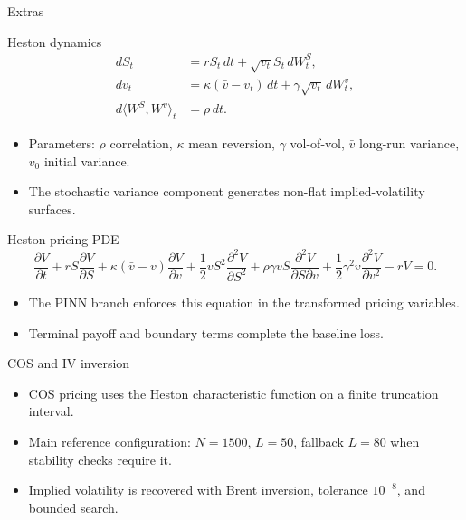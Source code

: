 \appendix

\begin{frame}[plain]
  \centering
  \vfill
  {\Huge Extras}
  \vfill
\end{frame}

\begin{frame}{Heston dynamics}
  \[
  \begin{aligned}
    dS_t &= rS_t\,dt+\sqrt{v_t}S_t\,dW_t^{S},\\
    dv_t &= \kappa(\bar v-v_t)\,dt+\gamma\sqrt{v_t}\,dW_t^{v},\\
    d\langle W^{S},W^{v}\rangle_t &= \rho\,dt.
  \end{aligned}
  \]

  \begin{itemize}
    \item Parameters: \(\rho\) correlation, \(\kappa\) mean reversion, \(\gamma\) vol-of-vol, \(\bar v\) long-run variance, \(v_0\) initial variance.
    \item The stochastic variance component generates non-flat implied-volatility surfaces.
  \end{itemize}
\end{frame}

\begin{frame}{Heston pricing PDE}
  \[
  \frac{\partial V}{\partial t}
  + rS\frac{\partial V}{\partial S}
  + \kappa(\bar v-v)\frac{\partial V}{\partial v}
  + \frac{1}{2}vS^2\frac{\partial^2 V}{\partial S^2}
  + \rho\gamma vS\frac{\partial^2 V}{\partial S\partial v}
  + \frac{1}{2}\gamma^2v\frac{\partial^2 V}{\partial v^2}
  - rV = 0.
  \]

  \begin{itemize}
    \item The PINN branch enforces this equation in the transformed pricing variables.
    \item Terminal payoff and boundary terms complete the baseline loss.
  \end{itemize}
\end{frame}

\begin{frame}{COS and IV inversion}
  \begin{itemize}
    \item COS pricing uses the Heston characteristic function on a finite truncation interval.
    \item Main reference configuration: \(N=1500\), \(L=50\), fallback \(L=80\) when stability checks require it.
    \item Implied volatility is recovered with Brent inversion, tolerance \(10^{-8}\), and bounded search.
  \end{itemize}
\end{frame}

